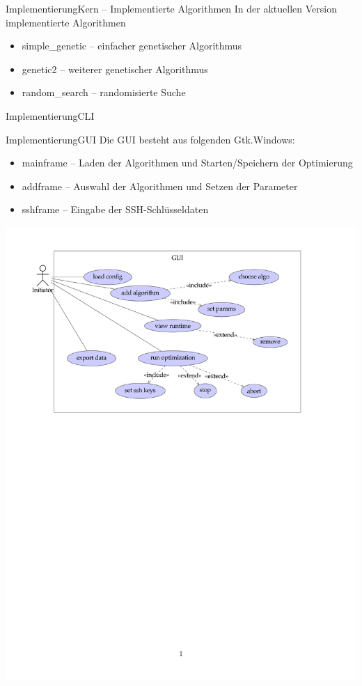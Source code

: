 \documentclass[ngerman,10pt,xcolor=colortbl,compress
]{beamer}
\begin{document}
	\begin{frame}{Implementierung}{Kern -- Implementierte Algorithmen}
	In der aktuellen Version implementierte Algorithmen
	\begin{itemize}
		\item simple\_genetic -- einfacher genetischer Algorithmus
		\item genetic2 -- weiterer genetischer Algorithmus
		\item random\_search -- randomisierte Suche
	\end{itemize}
	\end{frame}
	
	\begin{frame}{Implementierung}{CLI}
	\makeset
	\end{frame}

	\begin{frame}{Implementierung}{GUI}
	Die GUI besteht aus folgenden Gtk.Windows:
	\begin{itemize}
		\item mainframe -- Laden der Algorithmen und Starten/Speichern der Optimierung
		\item addframe -- Auswahl der Algorithmen und Setzen der Parameter
		\item sshframe -- Eingabe der SSH-Schlüsseldaten
	\end{itemize}
	\end{frame}
	
	\begin{frame}
	\includegraphics[scale=0.2]{GUI-use-case.png} 
	\end{frame}
	
\end{document}
